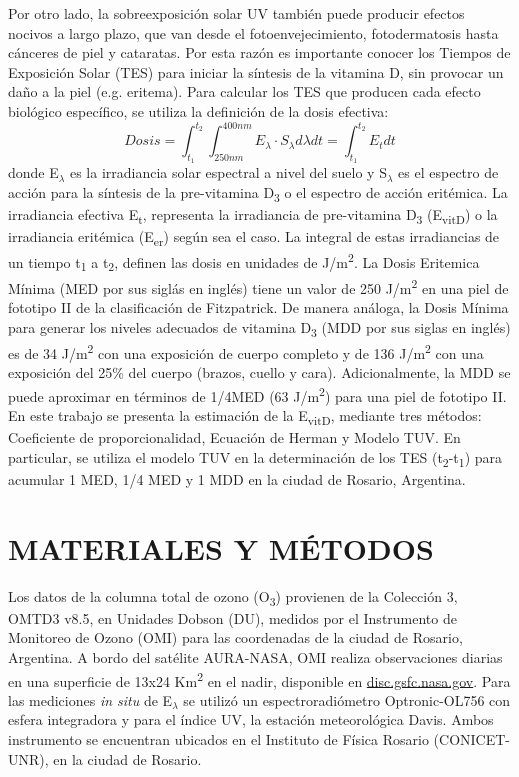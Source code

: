 \documentclass[10pt,twocolumn]{article}
\begin{document}
Por otro lado, la sobreexposición solar UV también puede producir efectos nocivos a largo plazo, que van desde el fotoenvejecimiento, fotodermatosis hasta cánceres de piel y cataratas.\cite{Gilaberte2011,Modenese2016} Por esta razón es importante conocer los Tiempos de Exposición Solar (TES) para iniciar la síntesis de la vitamina D, sin provocar un daño a la piel (e.g. eritema). Para calcular los TES que producen cada efecto biológico específico, se utiliza la definición de la dosis efectiva:
\begin{equation}
  Dosis=\int_{t_1}^{t_2} \int_{250nm}^{400nm} E_\lambda\cdot S_\lambda d\lambda dt = \int_{t_1}^{t_2}E_tdt \label{eq:dosis}
\end{equation}
donde E$_\lambda$ es la irradiancia solar espectral a nivel del suelo y S$_\lambda$ es el espectro de acción para la síntesis de la pre-vitamina D\textsubscript{3} o el espectro de acción eritémica. La irradiancia efectiva E\textsubscript{t}, representa la irradiancia de pre-vitamina D\textsubscript{3} (E\textsubscript{vitD}) o la irradiancia eritémica (E\textsubscript{er}) según sea el caso. La integral de estas irradiancias de un tiempo t\textsubscript{1} a t\textsubscript{2}, definen las dosis en unidades de J/m\textsuperscript{2}.
La Dosis Eritemica Mínima (MED por sus siglás en inglés) tiene un valor de 250 J/m\textsuperscript{2} en una piel de fototipo II de la clasificación de Fitzpatrick.\cite{Fitzpatrick1988} De manera análoga, la Dosis Mínima para generar los niveles adecuados de vitamina D\textsubscript{3} (MDD por sus siglas en inglés) es de 34 J/m\textsuperscript{2} con una exposición de cuerpo completo y de 136 J/m\textsuperscript{2} con una exposición del 25\% del cuerpo (brazos, cuello y cara).\cite{UVDoses, Fioletov_2010} Adicionalmente, la MDD se puede aproximar en términos de 1/4MED (63 J/m\textsuperscript{2}) para una piel de fototipo II\cite{Dowdy_2010}. En este trabajo se presenta la estimación de la E\textsubscript{vitD}, mediante tres métodos: Coeficiente de proporcionalidad,\cite{UVDoses} Ecuación de Herman\cite{Herman2010} y Modelo TUV.\cite{Madronich1987} En particular, se utiliza el modelo TUV en la determinación de los TES (t\textsubscript{2}-t\textsubscript{1}) para acumular 1 MED, 1/4 MED y 1 MDD en la ciudad de Rosario, Argentina.

\section{MATERIALES Y MÉTODOS}
Los datos de la columna total de ozono (O\textsubscript{3}) provienen de la Colección 3, OMTD3 v8.5, en Unidades Dobson (DU), medidos por el Instrumento de Monitoreo de Ozono (OMI) para las coordenadas de la ciudad de Rosario, Argentina. A bordo del satélite AURA-NASA, OMI realiza observaciones diarias en una superficie de 13x24 Km\textsuperscript{2} en el nadir, disponible en \href{(disc.gsfc.nasa.gov)}{\url{disc.gsfc.nasa.gov}}. Para las mediciones \emph{in situ} de E$_\lambda$ se utilizó un espectroradiómetro Optronic-OL756 con esfera integradora y para el índice UV, la estación meteorológica Davis. Ambos instrumento se encuentran ubicados en el Instituto de Física Rosario (CONICET-UNR), en la ciudad de Rosario.
\end{document}
